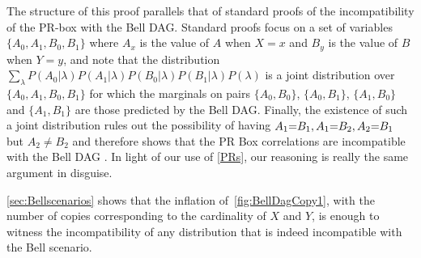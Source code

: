 
The structure of this proof parallels that of standard proofs of the incompatibility of the PR-box with the Bell DAG. Standard proofs focus on a set of variables $\{A_0, A_1, B_0, B_1\}$ where $A_x$  is the value of $A$ when $X=x$ and $B_y$  is the value of $B$ when $Y=y$, and note that  the distribution
 $\sum_{\lambda} P(A_0|\lambda)P(A_1|\lambda)P(B_0|\lambda)P(B_1|\lambda)P(\lambda)$
 is a joint distribution over $\{A_0, A_1, B_0, B_1\}$ for which the marginals on pairs  $\{ A_0, B_0\}$, $\{ A_0, B_1\}$, $\{ A_1, B_0\}$ and $\{ A_1, B_1\}$ are those predicted by the Bell DAG.  Finally, the existence of such a joint distribution rules out the possibility of having $A_1\mathord{=} B_1, A_1\mathord{=} B_2, A_2\mathord{=} B_1$ but $ A_2\ne B_2$ and therefore shows that the PR Box correlations are incompatible with the Bell DAG \cite{LSW,roberts_thesis}. In light of our use of \cref{PRs}, our reasoning is really the same argument in disguise.

\cref{sec:Bellscenarios} shows that the inflation of~\cref{fig:BellDagCopy1}, with the number of copies corresponding to the cardinality of $X$ and $Y$, is enough to witness the incompatibility of any distribution that is indeed incompatible with the Bell scenario.



